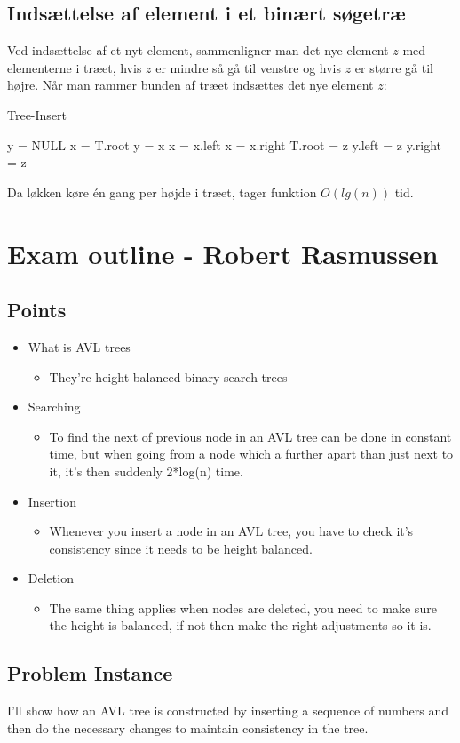 \documentclass[12pt]{article}
\begin{document}
\subsection*{Indsættelse af element i et binært søgetræ}
Ved indsættelse af et nyt element, sammenligner man det nye element $z$ med elementerne i træet, hvis $z$ er mindre så gå til venstre og hvis $z$ er større gå til højre. Når man rammer bunden af træet indsættes det nye element $z$:
\begin{algorithm}
 \caption{Tree-Insert}
 \begin{algorithmic}
   \State {}
      \State y = NULL
      \State x = T.root
         \State y = x
            \State x = x.left
         \Else
            \State x = x.right
         \EndIf
      \EndWhile
         T.root = z
         y.left = z
      \Else
          y.right = z
      \EndIf
   \EndFunction
\end{algorithmic}
\end{algorithm}
Da løkken køre én gang per højde i træet, tager funktion $O(lg(n))$ tid.
\newpage
\section*{Exam outline - Robert Rasmussen}
\subsection*{Points}
\begin{itemize}
\item What is AVL trees
	\begin{itemize}
	\item They're height balanced binary search trees
	\end{itemize}
\item Searching
	\begin{itemize}
	\item To find the next of previous node in an AVL tree can be done in constant time, but when going from a node which a further apart than just next to it, it's then suddenly 2*log(n) time.
	\end{itemize}
\item Insertion
	\begin{itemize}
	\item Whenever you insert a node in an AVL tree, you have to check it's consistency since it needs to be height balanced.
	\end{itemize}
\item Deletion
	\begin{itemize}
	\item The same thing applies when nodes are deleted, you need to make sure the height is balanced, if not then make the right adjustments so it is.
	\end{itemize}
\end{itemize}

\subsection*{Problem Instance}
I'll show how an AVL tree is constructed by inserting a sequence of numbers and then do the necessary changes to maintain consistency in the tree.
\end{document}
